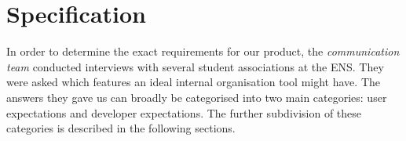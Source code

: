 \documentclass[a4paper, english]{report}
\begin{document}



\chapter{Specification}
\label{chap:Specification}
In order to determine the exact requirements for our product, the \emph{communication team} conducted interviews with several student associations at the ENS. They were asked which features an ideal internal organisation tool might have. The answers they gave us can broadly be categorised into two main categories: user expectations and developer expectations. The further subdivision of these categories is described in the following sections.
\end{document}
